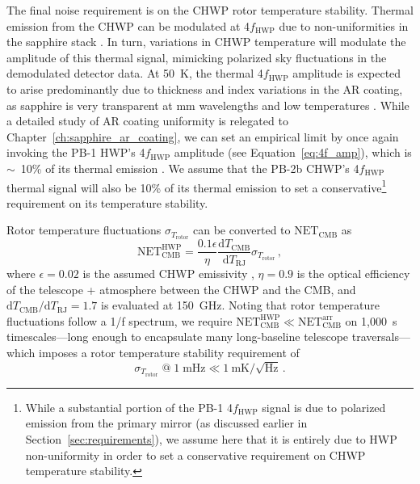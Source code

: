 The final noise requirement is on the CHWP rotor temperature stability.  Thermal emission from the CHWP can be modulated at 4$f_{\mathrm{HWP}}$ due to non-uniformities in the sapphire stack \cite{salatino_studies_2018}. In turn, variations in CHWP temperature will modulate the amplitude of this thermal signal, mimicking polarized sky fluctuations in the demodulated detector data. At 50~K, the thermal 4$f_{\mathrm{HWP}}$ amplitude is expected to arise predominantly due to thickness and index variations in the AR coating, as sapphire is very transparent at mm wavelengths and low temperatures \cite{parshin_silicon_1995,braginsky_experimental_1987}. While a detailed study of AR coating uniformity is relegated to Chapter~\ref{ch:sapphire_ar_coating}, we can set an empirical limit by once again invoking the PB-1 HWP's 4$f_{\mathrm{HWP}}$ amplitude (see Equation~\ref{eq:4f_amp}), which is $\sim$~10\% of its thermal emission \cite{takakura_performance_2017}. We assume that the PB-2b CHWP's 4$f_{\mathrm{HWP}}$ thermal signal will also be 10\% of its thermal emission to set a conservative\footnote{While a substantial portion of the PB-1 4$f_{\mathrm{HWP}}$ signal is due to polarized emission from the primary mirror (as discussed earlier in Section~\ref{sec:requirements}), we assume here that it is entirely due to HWP non-uniformity in order to set a conservative requirement on CHWP temperature stability.} requirement on its temperature stability.

Rotor temperature fluctuations $\sigma_{T_{\mathrm{rotor}}}$ can be converted to $\mathrm{NET_{CMB}}$ as
\begin{equation}
     \mathrm{NET_{CMB}^{HWP}} = \frac{0.1 \epsilon}{\eta} \frac{\mathrm{d} T_{\mathrm{CMB}}}{\mathrm{d} T_{\mathrm{RJ}}} \sigma_{T_{\mathrm{rotor}}} \, ,
\end{equation}
\noindent
where $\epsilon = 0.02$ is the assumed CHWP emissivity \cite{rosen_epoxy-based_2013}, $\eta = 0.9$ is the optical efficiency of the telescope + atmosphere between the CHWP and the CMB, and $\mathrm{d} T_{\mathrm{CMB}} / \mathrm{d} T_{\mathrm{RJ}} = 1.7$ is evaluated at 150~GHz. Noting that rotor temperature fluctuations follow a 1/f spectrum, we require $\mathrm{NET_{CMB}^{HWP}} \ll \mathrm{NET_{CMB}^{arr}}$ on 1,000~s timescales---long enough to encapsulate many long-baseline telescope traversals---which imposes a rotor temperature stability requirement of 
\begin{equation}
    \sigma_{T_{\mathrm{rotor}}} \; @ \; 1 \; \mathrm{mHz} \ll 1~\mathrm{mK / \sqrt{Hz}} \, .
    \label{eq:chwp_temp_requirement}
\end{equation}

